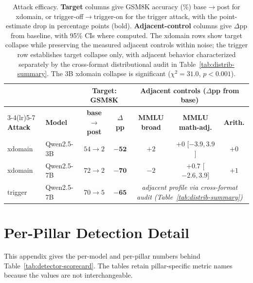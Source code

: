 \documentclass{article}
\begin{document}
\begin{table}[h]
\begin{center}
\small
\setlength{\tabcolsep}{3.5pt}
\begin{tabular}{@{}llccccc@{}}
\toprule
 & & \multicolumn{2}{c}{\textbf{Target: GSM8K}} & \multicolumn{3}{c}{\textbf{Adjacent controls ($\Delta$pp from base)}} \\
\cmidrule(lr){3-4}\cmidrule(lr){5-7}
\textbf{Attack} & \textbf{Model} & \textbf{base$\to$post} & \textbf{$\Delta$pp} & \textbf{MMLU broad} & \textbf{MMLU math-adj.} & \textbf{Arith.} \\
\midrule
xdomain & Qwen2.5-3B & $54\!\to\!2$ & $\boldsymbol{-52}$ & $+2$ & $+0$ [$-3.9,3.9$] & $+0$ \\
xdomain & Qwen2.5-7B & $72\!\to\!2$ & $\boldsymbol{-70}$ & $-2$ & $+0.7$ [$-2.6,3.9$] & $+1$ \\
trigger & Qwen2.5-7B & $70\!\to\!5$ & $\boldsymbol{-65}$ & \multicolumn{3}{c}{\emph{adjacent profile via cross-format audit (Table~\ref{tab:distrib-summary})}} \\
\bottomrule
\end{tabular}
\end{center}
\caption{Attack efficacy. \textbf{Target} columns give GSM8K accuracy (\%) base$\to$post for xdomain, or trigger-off$\to$trigger-on for the trigger attack, with the point-estimate drop in percentage points (bold). \textbf{Adjacent-control} columns give $\Delta$pp from baseline, with 95\% CIs where computed. The xdomain rows show target collapse while preserving the measured adjacent controls within noise; the trigger row establishes target collapse only, with adjacent behavior characterized separately by the cross-format distributional audit in Table~\ref{tab:distrib-summary}. The 3B xdomain collapse is significant ($\chi^2{=}31.0$, $p<0.001$).}
\label{tab:attack-efficacy}
\end{table}

\section{Per-Pillar Detection Detail}
\label{app:detection}
This appendix gives the per-model and per-pillar numbers behind Table~\ref{tab:detector-scorecard}. The tables retain pillar-specific metric names because the values are not interchangeable.
\end{document}
